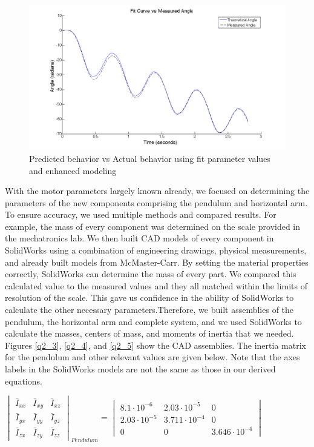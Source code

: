\documentclass{article}
\theoremstyle{plain}
\theoremstyle{definition}
\theoremstyle{remark}
\begin{document}
\begin{figure}[htb]
\begin{center}
\includegraphics[width = 14cm]{awesomefitFiner.png}
\caption{Predicted behavior vs Actual behavior using fit parameter values and enhanced modeling}
\label{q2_2}
\end{center}
\end{figure}

With the motor parameters largely known already, we focused on determining the parameters of the new components comprising the pendulum and horizontal arm. To ensure accuracy, we used multiple methods and compared results. For example, the mass of every component was determined on the scale provided in the mechatronics lab. We then built CAD models of every component in SolidWorks using a combination of engineering drawings, physical measurements, and already built models from McMaster-Carr. By setting the material properties correctly, SolidWorks can determine the mass of every part. We compared this calculated value to the measured values and they all matched within the limits of resolution of the scale. This gave us confidence in the ability of SolidWorks to calculate the other necessary parameters.Therefore, we built assemblies of the pendulum, the horizontal arm and complete system, and we used SolidWorks to calculate the masses, centers of mass, and moments of inertia that we needed. Figures \ref{q2_3}, \ref{q2_4}, and \ref{q2_5} show the CAD assemblies. The inertia matrix for the pendulum and other relevant values are given below. Note that the axes labels in the SolidWorks models are not the same as those in our derived equations.

\begin{center} $ \begin{vmatrix}
\bar{I}_{xx} & \bar{I}_{xy} & \bar{I}_{xz} \\
\bar{I}_{yx} & \bar{I}_{yy} & \bar{I}_{yz} \\
\bar{I}_{zx} & \bar{I}_{zy} &  \bar{I}_{zz} \end{vmatrix}_{Pendulum}
=  \begin{vmatrix}
8.1\cdot10^{-6} & 2.03\cdot10^{-5} & 0 \\
2.03\cdot10^{-5} & 3.711\cdot10^{-4} & 0 \\
0 & 0 &  3.646\cdot10^{-4} \end{vmatrix}$\end{center}
\end{document}
